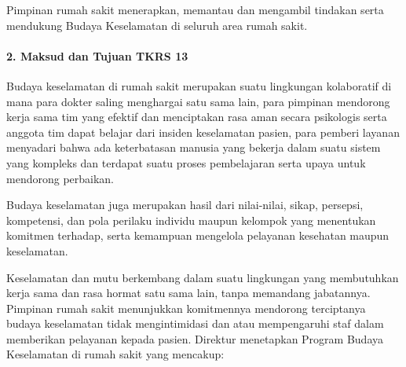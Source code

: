 \documentclass[
]{book}
\begin{document}
Pimpinan rumah sakit menerapkan, memantau dan mengambil tindakan serta mendukung Budaya Keselamatan di seluruh area rumah sakit.

\hypertarget{maksud-dan-tujuan-tkrs-13}{%
\paragraph*{2. Maksud dan Tujuan TKRS 13}\label{maksud-dan-tujuan-tkrs-13}}

Budaya keselamatan di rumah sakit merupakan suatu lingkungan kolaboratif di mana para dokter saling menghargai satu sama lain, para pimpinan mendorong kerja sama tim yang efektif dan menciptakan rasa aman secara psikologis serta anggota tim dapat belajar dari insiden keselamatan pasien, para pemberi layanan menyadari bahwa ada keterbatasan manusia yang bekerja dalam suatu sistem yang kompleks dan terdapat suatu proses pembelajaran serta upaya untuk mendorong perbaikan.

Budaya keselamatan juga merupakan hasil dari nilai-nilai, sikap, persepsi, kompetensi, dan pola perilaku individu maupun kelompok yang menentukan komitmen terhadap, serta kemampuan mengelola pelayanan kesehatan maupun keselamatan.

Keselamatan dan mutu berkembang dalam suatu lingkungan yang membutuhkan kerja sama dan rasa hormat satu sama lain, tanpa memandang jabatannya. Pimpinan rumah sakit menunjukkan komitmennya mendorong terciptanya budaya keselamatan tidak mengintimidasi dan atau mempengaruhi staf dalam memberikan pelayanan kepada pasien. Direktur menetapkan Program Budaya Keselamatan di rumah sakit yang mencakup:
\end{document}
